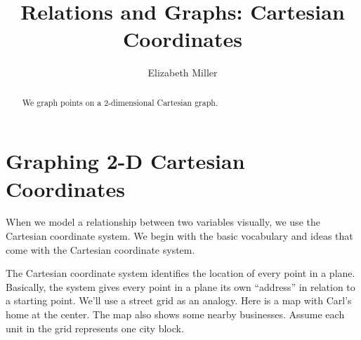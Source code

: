 \documentclass{ximera}
\author{Elizabeth Miller}
\title{Relations and Graphs: Cartesian Coordinates}
\begin{document}
\begin{abstract}
We graph points on a 2-dimensional Cartesian graph.  
\end{abstract}
\maketitle


\section{Graphing 2-D Cartesian Coordinates} 

When we model a relationship between two variables visually, we use the Cartesian coordinate system. We begin with the basic vocabulary and ideas that come with the Cartesian coordinate system.

The Cartesian coordinate system identifies the location of every point in a plane. Basically, the system gives every point in a plane its own ``address'' in relation to a starting point. We'll use a street grid as an analogy. Here is a map with Carl's home at the center. The map also shows some nearby businesses. Assume each unit in the grid represents one city block.

\begin{image}
\end{image}
\end{document}
